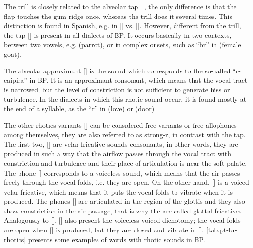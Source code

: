 The trill is closely related to the alveolar tap [], the only difference is that the flap touches the gum ridge once, whereas the trill does it several times. This distinction is found in Spanish, e.g. in  [] vs.  []. However, different from the trill, the tap [] is present in all dialects of \ac{BP}. It occurs basically in two contexts, between two vowels, e.g.  (parrot), or in complex onsets, such as ``br'' in  (female goat).

The alveolar approximant [] is the sound which corresponds to the so-called ``r-caipira'' in \ac{BP}. It is an approximant consonant, which means that the vocal tract is narrowed, but the level of constriction is not sufficient to generate hiss or turbulence. In the dialects in which this rhotic sound occur, it is found mostly at the end of a syllable, as the ``r'' in  (love) or  (door)

The other rhotics variants [] can be considered free variants or free allophones among themselves, they are also referred to as strong-r, in contrast with the tap. The first two, [] are velar fricative sounds consonants, in other words, they are produced in such a way that the airflow passes through the vocal tract with constriction and turbulence and their place of articulation is near the soft palate. The phone [] corresponds to a voiceless sound, which means that the air passes freely through the vocal folds, i.e. they are open. On the other hand, [] is a voiced velar fricative, which means that it puts the vocal folds to vibrate when it is produced. The phones [] are articulated in the region of the glottis and they also show constriction in the air passage, that is why the are called glottal fricatives. Analogously to [], [] also present the voiceless-voiced dichotomy; the vocal folds are open when [] is produced, but they are closed and vibrate in []. \autoref{tab:pt-br-rhotics} presents some examples of words with rhotic sounds in \ac{BP}.

